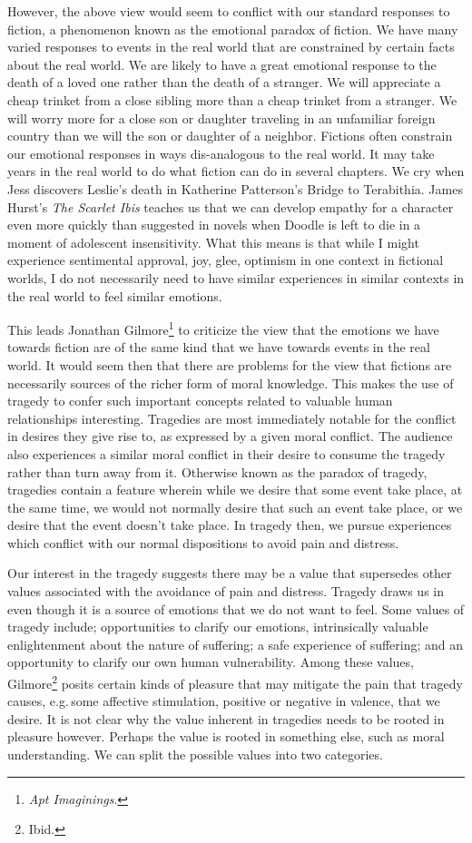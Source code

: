 \documentclass[phdthesis,12pt,final]{wuthesis}
\theoremstyle{definition}
\theoremstyle{definition}
\theoremstyle{definition}
\theoremstyle{definition}
\theoremstyle{remark}
\begin{document}
However, the above view would seem to conflict with our standard responses to fiction, a phenomenon known as the emotional paradox of fiction. We have many varied responses to events in the real world that are constrained by certain facts about the real world. We are likely to have a great emotional response to the death of a loved one rather than the death of a stranger. We will appreciate a cheap trinket from a close sibling more than a cheap trinket from a stranger. We will worry more for a close son or daughter traveling in an unfamiliar foreign country than we will the son or daughter of a neighbor. Fictions often constrain our emotional responses in ways dis-analogous to the real world. It may take years in the real world to do what fiction can do in several chapters. We cry when Jess discovers Leslie's death in Katherine Patterson's Bridge to Terabithia. James Hurst's \emph{The Scarlet Ibis} teaches us that we can develop empathy for a character even more quickly than suggested in novels when Doodle is left to die in a moment of adolescent insensitivity. What this means is that while I might experience sentimental approval, joy, glee, optimism in one context in fictional worlds, I do not necessarily need to have similar experiences in similar contexts in the real world to feel similar emotions.

This leads Jonathan Gilmore\footnote{\emph{Apt {Imaginings}}.} to criticize the view that the emotions we have towards fiction are of the same kind that we have towards events in the real world. It would seem then that there are problems for the view that fictions are necessarily sources of the richer form of moral knowledge. This makes the use of tragedy to confer such important concepts related to valuable human relationships interesting. Tragedies are most immediately notable for the conflict in desires they give rise to, as expressed by a given moral conflict. The audience also experiences a similar moral conflict in their desire to consume the tragedy rather than turn away from it. Otherwise known as the paradox of tragedy, tragedies contain a feature wherein while we desire that some event take place, at the same time, we would not normally desire that such an event take place, or we desire that the event doesn't take place. In tragedy then, we pursue experiences which conflict with our normal dispositions to avoid pain and distress.

Our interest in the tragedy suggests there may be a value that supersedes other values associated with the avoidance of pain and distress. Tragedy draws us in even though it is a source of emotions that we do not want to feel. Some values of tragedy include; opportunities to clarify our emotions, intrinsically valuable enlightenment about the nature of suffering; a safe experience of suffering; and an opportunity to clarify our own human vulnerability. Among these values, Gilmore\footnote{Ibid.} posits certain kinds of pleasure that may mitigate the pain that tragedy causes, e.g.\,some affective stimulation, positive or negative in valence, that we desire. It is not clear why the value inherent in tragedies needs to be rooted in pleasure however. Perhaps the value is rooted in something else, such as moral understanding. We can split the possible values into two categories.
\end{document}
